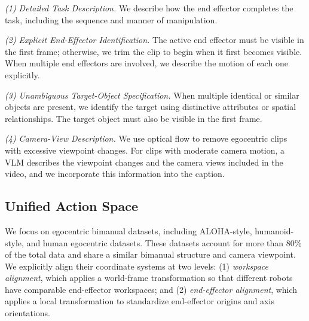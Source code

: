 \textit{(1) Detailed Task Description.}
We describe how the end effector completes the task, including the sequence and manner of manipulation.

\textit{(2) Explicit End-Effector Identification.}
The active end effector must be visible in the first frame; otherwise, we trim the clip to begin when it first becomes visible. When multiple end effectors are involved, we describe the motion of each one explicitly.

\textit{(3) Unambiguous Target-Object Specification.}
When multiple identical or similar objects are present, we identify the target using distinctive attributes or spatial relationships. The target object must also be visible in the first frame.

\textit{(4) Camera-View Description.}
We use optical flow to remove egocentric clips with excessive viewpoint changes. For clips with moderate camera motion, a VLM describes the viewpoint changes and the camera views included in the video, and we incorporate this information into the caption.

\subsection{Unified Action Space}

We focus on egocentric bimanual datasets, including ALOHA-style,
humanoid-style, and human egocentric datasets. These datasets
account for more than \(80\%\) of the total data and share a
similar bimanual structure and camera viewpoint.
We explicitly align their coordinate systems at two levels:
(1) \textit{workspace alignment}, which applies a world-frame
transformation so that different robots have comparable
end-effector workspaces; and (2) \textit{end-effector alignment},
which applies a local transformation to standardize end-effector
origins and axis orientations. 


